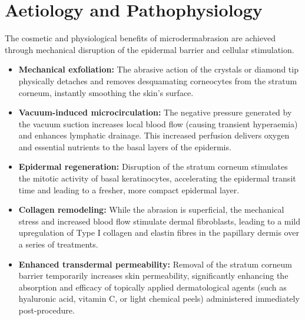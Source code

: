 \section*{Aetiology and Pathophysiology}
The cosmetic and physiological benefits of microdermabrasion are achieved through mechanical disruption of the epidermal barrier and cellular stimulation.
\begin{itemize}
    \item \textbf{Mechanical exfoliation:} The abrasive action of the crystals or diamond tip physically detaches and removes desquamating corneocytes from the stratum corneum, instantly smoothing the skin's surface.
    \item \textbf{Vacuum-induced microcirculation:} The negative pressure generated by the vacuum suction increases local blood flow (causing transient hyperaemia) and enhances lymphatic drainage. This increased perfusion delivers oxygen and essential nutrients to the basal layers of the epidermis.
    \item \textbf{Epidermal regeneration:} Disruption of the stratum corneum stimulates the mitotic activity of basal keratinocytes, accelerating the epidermal transit time and leading to a fresher, more compact epidermal layer.
    \item \textbf{Collagen remodeling:} While the abrasion is superficial, the mechanical stress and increased blood flow stimulate dermal fibroblasts, leading to a mild upregulation of Type I collagen and elastin fibres in the papillary dermis over a series of treatments.
    \item \textbf{Enhanced transdermal permeability:} Removal of the stratum corneum barrier temporarily increases skin permeability, significantly enhancing the absorption and efficacy of topically applied dermatological agents (such as hyaluronic acid, vitamin C, or light chemical peels) administered immediately post-procedure.
\end{itemize}

